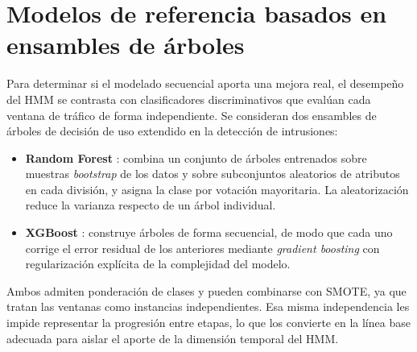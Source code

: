 \section{Modelos de referencia basados en ensambles de árboles}
Para determinar si el modelado secuencial aporta una mejora real, el desempeño del HMM se contrasta con clasificadores discriminativos que evalúan cada ventana de tráfico de forma independiente. Se consideran dos ensambles de árboles de decisión de uso extendido en la detección de intrusiones:
\begin{itemize}
    \item \textbf{Random Forest} \parencite{breiman2001random}: combina un conjunto de árboles entrenados sobre muestras \textit{bootstrap} de los datos y sobre subconjuntos aleatorios de atributos en cada división, y asigna la clase por votación mayoritaria. La aleatorización reduce la varianza respecto de un árbol individual.
    \item \textbf{XGBoost} \parencite{chen2016xgboost}: construye árboles de forma secuencial, de modo que cada uno corrige el error residual de los anteriores mediante \textit{gradient boosting} con regularización explícita de la complejidad del modelo.
\end{itemize}
Ambos admiten ponderación de clases y pueden combinarse con SMOTE, ya que tratan las ventanas como instancias independientes. Esa misma independencia les impide representar la progresión entre etapas, lo que los convierte en la línea base adecuada para aislar el aporte de la dimensión temporal del HMM.